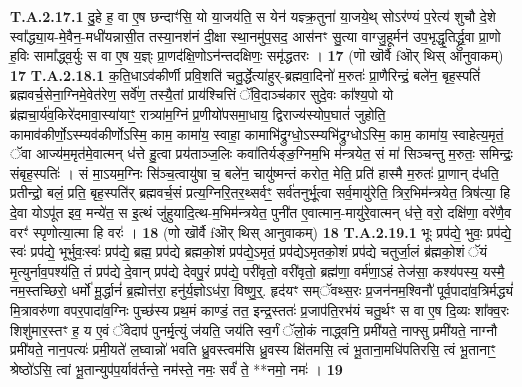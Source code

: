 \documentclass[17pt]{extarticle}
\begin{document}
                                \textbf{ T.A.2.17.1} \newline
                  दु॒हे ह॒ वा ए॒ष छन्दाꣳ॑सि॒ यो या॒जय॑ति॒ स येन॑ यज्ञ्क्र॒तुना॑ या॒जये॒थ् सोऽर॑ण्यं प॒रेत्य॑ शुचौ दे॒शे स्वा᳚द्ध्या॒य-मे॒वैन॒-मधी॑यन्नासी॒त तस्या॒नश॑नं दी॒क्षा स्था॒नमु॑प॒सद॒ आस॑नꣳ सु॒त्या वाग्जु॒हूर्मन॑ उप॒भृद्धृ॒तिर्द्ध्रु॒वा प्रा॒णो ह॒विः सामा᳚द्ध्व॒र्युः स वा ए॒ष य॒ज्ञ्ः  प्रा॒णद॑क्षि॒णोऽन॑न्तदक्षिणः॒ समृ॑द्धतरः । \textbf{ 17} \newline
                  \newline
                                                        (णॊ खॊर्वै fऒर् थिस् आनुवाकम्) \textbf{17} \newline \newline
                                \textbf{ T.A.2.18.1} \newline
                  क॒ति॒धाऽव॑कीर्णी प्रवि॒शति॑ चतु॒र्द्धेत्या॑हुर्-ब्रह्मवा॒दिनो॑ म॒रुतः॑ प्रा॒णैरिन्द्रं॒ बले॑न॒ बृह॒स्पतिं॑ ब्रह्मवर्च॒सेना॒ग्निमे॒वेत॑रेण॒ सर्वे॑ण॒ तस्यै॒तां प्राय॑श्चित्तिं ॅवि॒दाञ्च॑कार सुदे॒वः का᳚श्य॒पो यो  ब्र॑ह्मचा॒र्य॑व॒किरे॑दमावा॒स्या॑याꣳ॒॒ रात्र्या॑म॒ग्निं प्र॒णीयो॑पसमा॒धाय॒ द्विराज्य॑स्योप॒घातं॑ जुहोति॒ कामाव॑कीर्णो॒ऽस्म्यव॑कीर्णोऽस्मि॒ काम॒ कामा॑य॒ स्वाहा॒ कामाभि॑द्रुग्धो॒ऽस्म्यभि॑द्रुग्धोऽस्मि॒ काम॒ कामा॑य॒ स्वाहेत्य॒मृतं॒ ॅवा आज्य॑म॒मृत॑मे॒वात्मन् ध॑त्ते हु॒त्वा प्रय॑ताञ्ज॒लिः कवा॑तिर्यङ्ङ॒ग्निम॒भि म॑न्त्रयेत॒ सं मा॑ सिञ्चन्तु म॒रुतः॒ समिन्द्रः॒ संबृह॒स्पतिः॑ ।  सं मा॒ऽयम॒ग्निः सि॑ञ्च॒त्वायु॑षा च॒ बले॑न॒ चायु॑ष्मन्तं करोत॒ मेति॒ प्रति॑ हास्मै म॒रुतः॑ प्रा॒णान् द॑धति॒ प्रतीन्द्रो॒ बलं॒ प्रति॒ बृह॒स्पति॑र् ब्रह्मवर्च॒सं प्रत्य॒ग्निरि॒तर॒थ्सर्वꣳ॒॒ सर्व॑तनुर्भू॒त्वा सर्व॒मायु॑रेति॒ त्रिर॒भिम॑न्त्रयेत॒ त्रिष॑त्या॒ हि दे॒वा योऽपू॑त इव॒ मन्ये॑त॒ स इ॒त्थं जु॑हुयादि॒त्थ-म॒भिम॑न्त्रयेत॒ पुनी॑त ए॒वात्मान॒-मायु॑रे॒वात्मन् ध॑त्ते॒ वरो॒ दक्षि॑णा॒ वरे॑णै॒व वरꣳ॑ स्पृणोत्या॒त्मा हि वरः॑ । \textbf{ 18} \newline
                  \newline
                                                        (णो खॊर्वै fऒर् थिस् आनुवाकम्) \textbf{18} \newline \newline
                                \textbf{ T.A.2.19.1} \newline
                  भूः प्रप॑द्ये॒ भुवः॒ प्रप॑द्ये॒ स्वः॑ प्रप॑द्ये॒ भूर्भुवः॒स्वः॑ प्रप॑द्ये॒ ब्रह्म॒ प्रप॑द्ये ब्रह्मको॒शं प्रप॑द्ये॒ऽमृतं॒ प्रप॑द्येऽमृतको॒शं प्रप॑द्ये चतुर्जा॒लं ब्र॑ह्मको॒शं ॅयं मृ॒त्युर्नाव॒पश्य॑ति॒ तं प्रप॑द्ये दे॒वान् प्रप॑द्ये देवपु॒रं प्रप॑द्ये॒ परी॑वृतो॒ वरी॑वृतो॒ ब्रह्म॑णा॒ वर्म॑णा॒ऽहं तेज॑सा॒ कश्य॑पस्य॒ यस्मै॒ नम॒स्तच्छिरो॒ धर्मो॑ मू॒र्द्धानं॑ ब्र॒ह्मोत्त॑रा॒ हनु॑र्य॒ज्ञोऽध॑रा॒ विष्णु॒र्॒. हृद॑यꣳ सम्ॅवथ्स॒रः प्र॒जन॑नम॒श्विनौ॑ पूर्व॒पादा॑व॒त्रिर्मद्ध्यं॑ मि॒त्रावरु॑णा वपर॒पादा॑व॒ग्निः पुच्छ॑स्य प्रथ॒मं काण्डं॒ तत॒ इन्द्र॒स्ततः॑ प्र॒जाप॑ति॒रभ॑यं चतु॒र्थꣳ स वा ए॒ष दि॒व्यः शा᳚क्व॒रः शिशु॑मार॒स्तꣳ ह॒ य ए॒वं ॅवेदाप॑ पुनर्मृ॒त्युं ज॑यति॒ जय॑ति स्व॒र्गं ॅलो॒कं नाद्ध्वनि॒ प्रमी॑यते॒ नाफ्सु प्रमी॑यते॒ नाग्नौ प्रमी॑यते॒ नान॒पत्यः॑ प्रमी॒यते॑ ल॒घ्वान्नो॑ भवति ध्रु॒वस्त्वम॑सि ध्रु॒वस्य क्षि॑तमसि॒ त्वं भू॒ताना॒मधि॑पतिरसि॒ त्वं भू॒तानाꣳ॒॒ श्रेष्ठो॑ऽसि॒ त्वां भू॒तान्युप॑प॒र्याव॑र्तन्ते॒ नम॑स्ते॒ नमः॒ सर्वं॑ ते॒ **नमो॒ नमः॑ । \textbf{ 19} \newline
\end{document}
